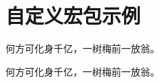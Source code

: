 \documentclass[UTF8, fontset=adobe]{ctexart}
\begin{document}
\section{自定义宏包示例}
何方可化身千亿，一树梅前一放翁。


何方可化身千亿，一树梅前一放翁。
\end{document}
